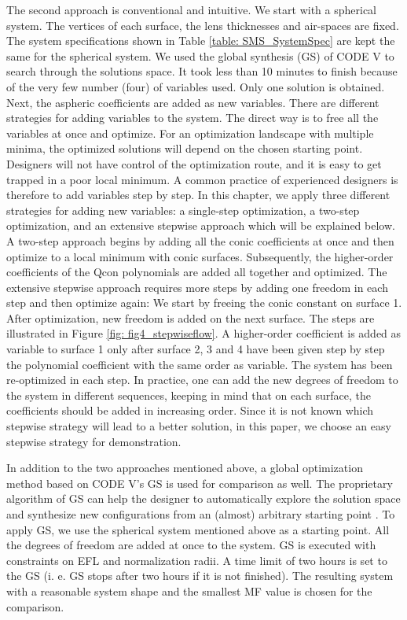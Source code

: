 The second approach is conventional and intuitive. We start with a spherical system. The vertices of each surface, the lens thicknesses and air-spaces are fixed. The system specifications shown in Table \ref{table: SMS_SystemSpec} are kept the same for the spherical system. We used the global synthesis (GS) of CODE V to search through the solutions space. It took less than 10 minutes to finish because of the very few number (four) of variables used. Only one solution is obtained. Next, the aspheric coefficients are added as new variables. There are different strategies for adding variables to the system. The direct way is to free all the variables at once and optimize. For an optimization landscape with multiple minima, the optimized solutions will depend on the chosen starting point. Designers will not have control of the optimization route, and it is easy to get trapped in a poor local minimum. A common practice of experienced designers is therefore to add variables step by step. In this chapter, we apply three different strategies for adding new variables: a single-step optimization, a two-step optimization, and an extensive stepwise approach which will be explained below. A two-step approach begins by adding all the conic coefficients at once and then optimize to a local minimum with conic surfaces. Subsequently, the higher-order coefficients of the Qcon polynomials are added all together and optimized. The extensive stepwise approach requires more steps by adding one freedom in each step and then optimize again: We start by freeing the conic constant on surface 1. After optimization, new freedom is added on the next surface. The steps are illustrated in Figure \ref{fig: fig4_stepwiseflow}. A higher-order coefficient is added as variable to surface 1 only after surface 2, 3 and 4 have been given step by step the polynomial coefficient with the same order as variable. The system has been re-optimized in each step. In practice, one can add the new degrees of freedom to the system in different sequences, keeping in mind that on each surface, the coefficients should be added in increasing order. Since it is not known which stepwise strategy will lead to a better solution, in this paper, we choose an easy stepwise strategy for demonstration.  

In addition to the two approaches mentioned above, a global optimization method based on CODE V’s GS is used for comparison as well. The proprietary algorithm of GS can help the designer to automatically explore the solution space and synthesize new configurations from an (almost) arbitrary starting point \cite{codevmanual}. To apply GS, we use the spherical system mentioned above as a starting point. All the degrees of freedom are added at once to the system. GS is executed with constraints on EFL and normalization radii. A time limit of two hours is set to the GS (i. e. GS stops after two hours if it is not finished). The resulting system with a reasonable system shape and the smallest MF value is chosen for the comparison. 

